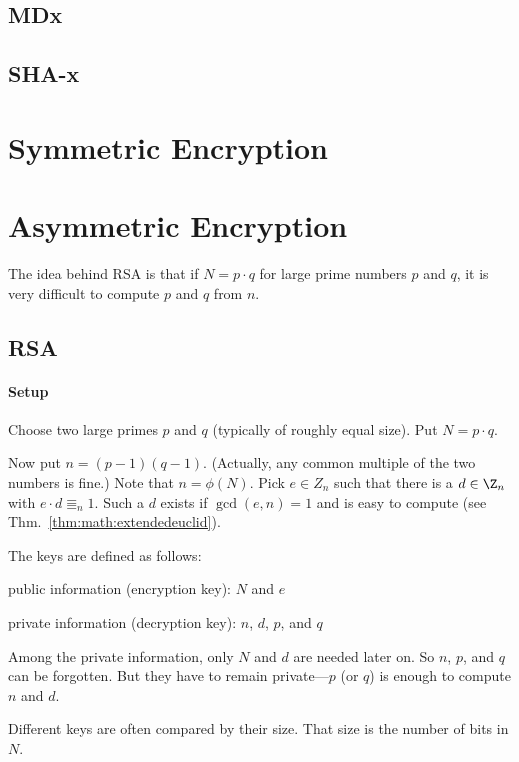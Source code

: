 \subsection{MDx}

\subsection{SHA-x}


\section{Symmetric Encryption}


\section{Asymmetric Encryption}

The idea behind RSA is that if $N=p\cdot q$ for large prime numbers $p$ and $q$, it is very difficult to compute $p$ and $q$ from $n$.

\subsection{RSA}

\paragraph{Setup}
Choose two large primes $p$ and $q$ (typically of roughly equal size).
Put $N=p\cdot q$.

Now put $n=(p-1)(q-1)$. (Actually, any common multiple of the two numbers is fine.)
Note that $n=\phi(N)$.
Pick $e\in Z_n$ such that there is a $d\in\Z_n$ with $e\cdot d\Equiv_n 1$.
Such a $d$ exists if $\gcd(e,n)=1$ and is easy to compute (see Thm.~\ref{thm:math:extendedeuclid}).

The keys are defined as follows:
\begin{compactitem}
 \item public information (encryption key): $N$ and $e$
 \item private information (decryption key): $n$, $d$, $p$, and $q$
\end{compactitem}
Among the private information, only $N$ and $d$ are needed later on.
So $n$, $p$, and $q$ can be forgotten.
But they have to remain private---$p$ (or $q$) is enough to compute $n$ and $d$.

Different keys are often compared by their size.
That size is the number of bits in $N$.

